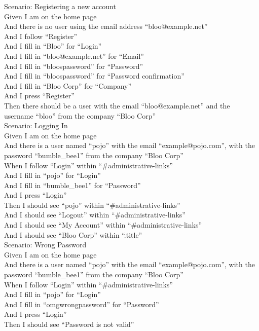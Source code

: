 \documentclass[12pt]{article}
\begin{document}
\begin{hangparas}{0.25in}{1}
Scenario: Registering a new account \\
Given I am on the home page \\
And there is no user using the email address ``bloo@example.net'' \\
And I follow ``Register'' \\
And I fill in ``Bloo'' for ``Login'' \\
And I fill in ``bloo@example.net'' for ``Email'' \\
And I fill in ``bloospassword'' for ``Password'' \\
And I fill in ``bloospassword'' for ``Password confirmation'' \\
And I fill in ``Bloo Corp'' for ``Company'' \\
And I press ``Register'' \\
Then there should be a user with the email ``bloo@example.net'' and the username ``bloo'' from the company ``Bloo Corp'' \\

Scenario: Logging In \\
Given I am on the home page \\
And there is a user named ``pojo'' with the email ``example@pojo.com'', with the password ``bumble\_bee1'' from the company ``Bloo Corp'' \\
When I follow ``Login'' within ``\#administrative-links'' \\
And I fill in ``pojo'' for ``Login'' \\
And I fill in ``bumble\_bee1'' for ``Password'' \\
And I press ``Login'' \\
Then I should see ``pojo'' within ``\#administrative-links'' \\
And I should see ``Logout'' within ``\#administrative-links'' \\
And I should see ``My Account'' within ``\#administrative-links'' \\
And I should see ``Bloo Corp'' within ``.title'' \\

Scenario: Wrong Password \\
  Given I am on the home page \\
  And there is a user named ``pojo'' with the email ``example@pojo.com'', with the password ``bumble\_bee1'' from the company ``Bloo Corp'' \\
  When I follow ``Login'' within ``\#administrative-links'' \\
  And I fill in ``pojo'' for ``Login'' \\
  And I fill in ``omgwrongpassword'' for ``Password'' \\
  And I press ``Login'' \\
  Then I should see ``Password is not valid'' \\


\end{hangparas}
\end{document}
